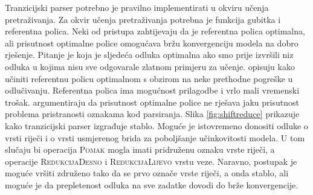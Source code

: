 Tranzicijski parser potrebno je pravilno implementirati u okviru učenja
pretraživanja. Za okvir učenja pretraživanja potrebna je funkcija gubitka i
referentna polica. Neki od pristupa zahtijevaju da je referentna polica
optimalna, ali prisutnost optimalne police omogućava bržu konvergenciju modela
na dobro rješenje. Pitanje je koja je sljedeća odluka optimalna ako smo prije
izvršili niz odluka u kojima nisu sve odgovarale zlatnom primjeru za učenje.
\citet{goldberg2013training} opisuju kako učiniti referentnu policu optimalnom s
obzirom na neke prethodne pogreške u odlučivanju. Referentna polica ima
mogućnost prilagodbe i vrlo mali vremenski trošak. \citet{andor2016globally}
argumentiraju da prisutnost optimalne police ne rješava jaku prisutnost problema
pristranosti oznakama kod parsiranja. Slika \ref{fig:shiftreduce} prikazuje kako
tranzicijski parser izgrađuje stablo. Moguće je istovremeno donositi odluke o
vrsti riječi i o vrsti usmjerenog brida za poboljšanje učinkovitosti modela. U
tom slučaju bi operacija \textsc{Pomak} mogla imati pridruženu oznaku vrste
riječi, a operacije \textsc{RedukcijaDesno} i \textsc{RedukcijaLijevo} vrstu
veze. Naravno, postupak je moguće vršiti združeno tako da se prvo označe vrste
riječi, a onda stablo, ali moguće je da prepletenost odluka na sve zadatke
dovodi do brže konvergencije.

